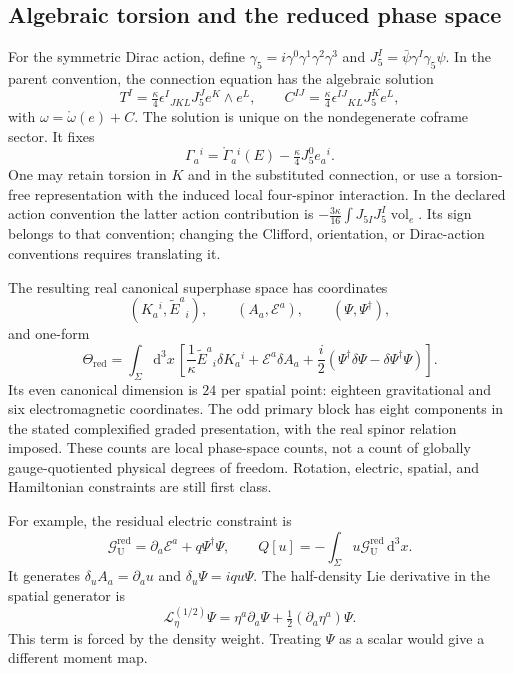 \subsection{Algebraic torsion and the reduced phase space}
For the symmetric Dirac action, define
$\gamma_5=i\gamma^0\gamma^1\gamma^2\gamma^3$ and
$J_5^I=\bar\psi\gamma^I\gamma_5\psi$.
In the parent convention, the connection equation has the algebraic solution
\begin{equation}
 T^I=\tfrac\kappa4\epsilon^I{}_{JKL}J_5^Je^K\wedge e^L,
 \qquad
 C^{IJ}=\tfrac\kappa4\epsilon^{IJ}{}_{KL}J_5^Ke^L,
\end{equation}
with $\omega=\mathring\omega(e)+C$.
The solution is unique on the nondegenerate coframe sector. It fixes
\begin{equation}
 \Gamma_a{}^i=\mathring\Gamma_a{}^i(E)
                     -\tfrac\kappa4J_5^0e_a{}^i.
\end{equation}
One may retain torsion in $K$ and in the substituted connection, or use a torsion-free representation with the induced local four-spinor interaction. In the declared action convention the latter action contribution is
$-\tfrac{3\kappa}{16}\int J_{5I}J_5^I\operatorname{vol}_e$.
Its sign belongs to that convention; changing the Clifford, orientation, or Dirac-action conventions requires translating it.

The resulting real canonical superphase space has coordinates
\begin{equation}
 (K_a{}^i,\widetilde E^a{}_i),\qquad
 (A_a,\mathcal E^a),\qquad (\Psi,\Psi^\dagger),
\end{equation}
and one-form
\begin{equation}
 \Theta_{\mathrm{red}}=\int_\Sigma\mathrm d^3x\,
 \left[\frac1\kappa\widetilde E^a{}_i\delta K_a{}^i
       +\mathcal E^a\delta A_a
       +\frac i2(\Psi^\dagger\delta\Psi-\delta\Psi^\dagger\Psi)\right].
 \label{c:constraints:reduced-one-form}
\end{equation}
Its even canonical dimension is $24$ per spatial point: eighteen gravitational and six electromagnetic coordinates. The odd primary block has eight components in the stated complexified graded presentation, with the real spinor relation imposed. These counts are local phase-space counts, not a count of globally gauge-quotiented physical degrees of freedom. Rotation, electric, spatial, and Hamiltonian constraints are still first class.

For example, the residual electric constraint is
\begin{equation}
 \mathcal G_{\mathrm U}^{\mathrm{red}}=\partial_a\mathcal E^a+q\Psi^\dagger\Psi,
 \qquad Q[u]=-\int_\Sigma u\mathcal G_{\mathrm U}^{\mathrm{red}}\,\mathrm d^3x.
\end{equation}
It generates $\delta_uA_a=\partial_au$ and $\delta_u\Psi=iqu\Psi$. The half-density Lie derivative in the spatial generator is
\begin{equation}
 \mathcal L_\eta^{(1/2)}\Psi
       =\eta^a\partial_a\Psi+\tfrac12(\partial_a\eta^a)\Psi.
\end{equation}
This term is forced by the density weight. Treating $\Psi$ as a scalar would give a different moment map.

